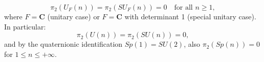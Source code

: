 $$\pi_2(U_F(n)) = \pi_2(SU_F(n)) = 0 \quad \text{for all } n \geq 1,$$
where $F = \mathbf{C}$ (unitary case) or $F = \mathbf{C}$ with determinant 1 (special unitary case). In particular:
$$\pi_2(U(n)) = \pi_2(SU(n)) = 0,$$
and by the quaternionic identification $Sp(1) = SU(2)$, also $\pi_2(Sp(n)) = 0$ for $1 \leq n \leq +\infty$.
